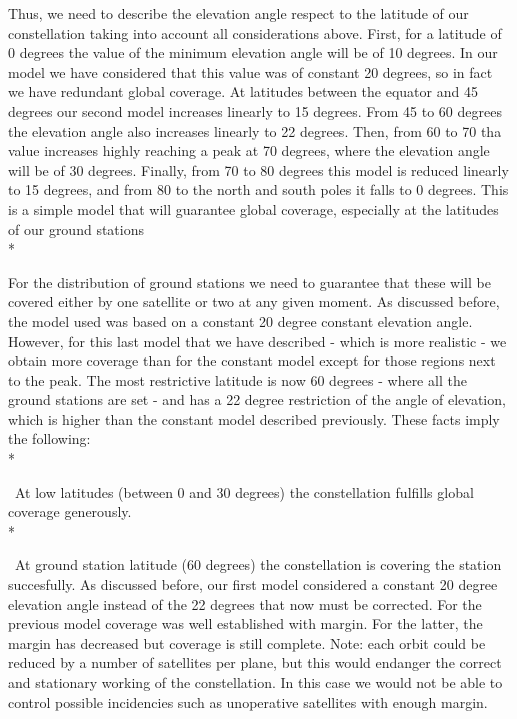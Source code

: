 \documentclass{article}
\begin{document}
Thus, we need to describe the elevation angle respect to the latitude of our constellation taking into account all considerations above. First, for a latitude of 0 degrees the value of the minimum elevation angle will be of 10 degrees. In our model we have considered that this value was of constant 20 degrees, so in fact we have redundant global coverage. At latitudes between the equator and 45 degrees our second model increases linearly to 15 degrees. From 45 to 60 degrees the elevation angle also increases linearly to 22 degrees. Then, from 60 to 70 tha value increases highly reaching a peak at 70 degrees, where the elevation angle will be of 30 degrees. Finally, from 70 to 80 degrees this model is reduced linearly to 15 degrees, and from 80 to the north and south poles it falls to 0 degrees. This is a simple model that will guarantee global coverage, especially at the latitudes of our ground stations \\*

For the distribution of ground stations we need to guarantee that these will be covered either by one satellite or two at any given moment. As discussed before, the model used was based on a constant 20 degree constant elevation angle. However, for this last model that we have described - which is more realistic - we obtain more coverage than for the constant model except for those regions next to the peak. The most restrictive latitude is now 60 degrees - where all the ground stations are set - and has a 22 degree restriction of the angle of elevation, which is higher than the constant model described previously. These facts imply the following: \\*

\textendash\  At low latitudes (between 0 and 30 degrees) the constellation fulfills global coverage generously. \\*

\textendash\ At ground station latitude (60 degrees) the constellation is covering the station succesfully. As discussed before, our first model considered a constant 20 degree elevation angle instead of the 22 degrees that now must be corrected. For the previous model coverage was well established with margin. For the latter, the margin has decreased but coverage is still complete. Note: each orbit could be reduced by a number of satellites per plane, but this would endanger the correct and stationary working of the constellation. In this case we would not be able to control possible incidencies such as unoperative satellites with enough margin. \\
\end{document}
